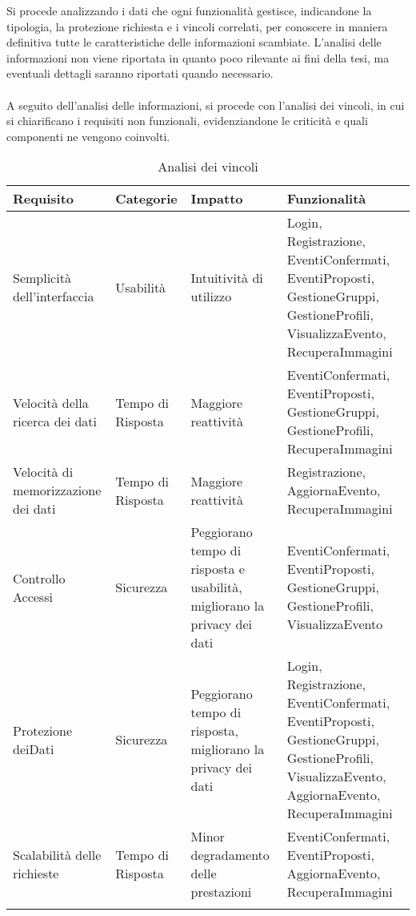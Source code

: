 Si procede analizzando i dati che ogni funzionalità gestisce,
indicandone la tipologia, la protezione richiesta e i vincoli correlati,
per conoscere in maniera definitiva tutte le caratteristiche delle informazioni scambiate.
L'analisi delle informazioni non viene riportata in quanto poco rilevante ai fini della tesi,
ma eventuali dettagli saranno riportati quando necessario.\\
\\
A seguito dell'analisi delle informazioni, si procede con l'analisi dei vincoli,
in cui si chiarificano i requisiti non funzionali,
evidenziandone le criticità e quali componenti ne vengono coinvolti.\\


\begin{longtable} {|P{3.5cm}|P{2cm}|P{3.5cm}|P{6cm}|}
    \hline
    \textbf{Requisito}                  & \textbf{Categorie} & \textbf{Impatto}                                                         & \textbf{Funzionalità}                                                                                                                       \\
    \hline
    \endhead
    Semplicità dell'interfaccia         & Usabilità          & Intuitività di utilizzo                                                  & Login, Registrazione, EventiConfermati, EventiProposti, GestioneGruppi, GestioneProfili, VisualizzaEvento, RecuperaImmagini                 \\
    \hline
    Velocità della ricerca dei dati     & Tempo di Risposta  & Maggiore reattività                                                      & EventiConfermati, EventiProposti, GestioneGruppi, GestioneProfili, RecuperaImmagini                                                         \\
    \hline
    Velocità di memorizzazione dei dati & Tempo di Risposta  & Maggiore reattività                                                      & Registrazione, AggiornaEvento, RecuperaImmagini                                                                                             \\
    \hline
    Controllo Accessi                   & Sicurezza          & Peggiorano tempo di risposta e usabilità, migliorano la privacy dei dati & EventiConfermati, EventiProposti, GestioneGruppi, GestioneProfili, VisualizzaEvento                                                         \\
    \hline
    Protezione dei\linebreak Dati       & Sicurezza          & Peggiorano tempo di risposta, migliorano la privacy dei dati             & Login, Registrazione, EventiConfermati, EventiProposti, GestioneGruppi, GestioneProfili, VisualizzaEvento, AggiornaEvento, RecuperaImmagini \\
    \hline
    Scalabilità delle richieste         & Tempo di Risposta  & Minor degradamento delle prestazioni                                     & EventiConfermati, EventiProposti, AggiornaEvento, RecuperaImmagini                                                                          \\
    \hline
    \caption{Analisi dei vincoli}
\end{longtable}


